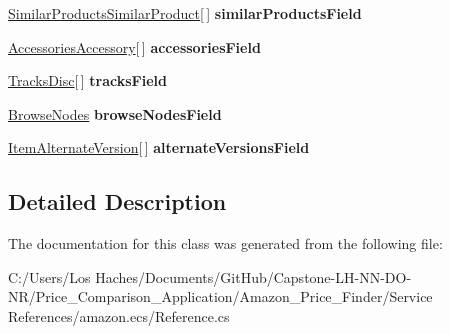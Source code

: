 \begin{DoxyCompactItemize}
\item 
\hypertarget{class_price___comparison_1_1amazon_1_1ecs_1_1_item_a28c4cb9fbbd99897adc005427106b124}{\hyperlink{class_price___comparison_1_1amazon_1_1ecs_1_1_similar_products_similar_product}{Similar\-Products\-Similar\-Product}\mbox{[}$\,$\mbox{]} {\bfseries similar\-Products\-Field}}\label{class_price___comparison_1_1amazon_1_1ecs_1_1_item_a28c4cb9fbbd99897adc005427106b124}

\item 
\hypertarget{class_price___comparison_1_1amazon_1_1ecs_1_1_item_a4177f8792b22393487dab7e07fd50b01}{\hyperlink{class_price___comparison_1_1amazon_1_1ecs_1_1_accessories_accessory}{Accessories\-Accessory}\mbox{[}$\,$\mbox{]} {\bfseries accessories\-Field}}\label{class_price___comparison_1_1amazon_1_1ecs_1_1_item_a4177f8792b22393487dab7e07fd50b01}

\item 
\hypertarget{class_price___comparison_1_1amazon_1_1ecs_1_1_item_afe0cf225f09d865fc55a88a58b527470}{\hyperlink{class_price___comparison_1_1amazon_1_1ecs_1_1_tracks_disc}{Tracks\-Disc}\mbox{[}$\,$\mbox{]} {\bfseries tracks\-Field}}\label{class_price___comparison_1_1amazon_1_1ecs_1_1_item_afe0cf225f09d865fc55a88a58b527470}

\item 
\hypertarget{class_price___comparison_1_1amazon_1_1ecs_1_1_item_a359ee4208c53eba5beeedab0f1f40f58}{\hyperlink{class_price___comparison_1_1amazon_1_1ecs_1_1_browse_nodes}{Browse\-Nodes} {\bfseries browse\-Nodes\-Field}}\label{class_price___comparison_1_1amazon_1_1ecs_1_1_item_a359ee4208c53eba5beeedab0f1f40f58}

\item 
\hypertarget{class_price___comparison_1_1amazon_1_1ecs_1_1_item_a7386fb550ec3e838392b40f013af1ea6}{\hyperlink{class_price___comparison_1_1amazon_1_1ecs_1_1_item_alternate_version}{Item\-Alternate\-Version}\mbox{[}$\,$\mbox{]} {\bfseries alternate\-Versions\-Field}}\label{class_price___comparison_1_1amazon_1_1ecs_1_1_item_a7386fb550ec3e838392b40f013af1ea6}

\end{DoxyCompactItemize}


\subsection{Detailed Description}


The documentation for this class was generated from the following file\-:\begin{DoxyCompactItemize}
\item 
C\-:/\-Users/\-Los Haches/\-Documents/\-Git\-Hub/\-Capstone-\/\-L\-H-\/\-N\-N-\/\-D\-O-\/\-N\-R/\-Price\-\_\-\-Comparison\-\_\-\-Application/\-Amazon\-\_\-\-Price\-\_\-\-Finder/\-Service References/amazon.\-ecs/Reference.\-cs\end{DoxyCompactItemize}
